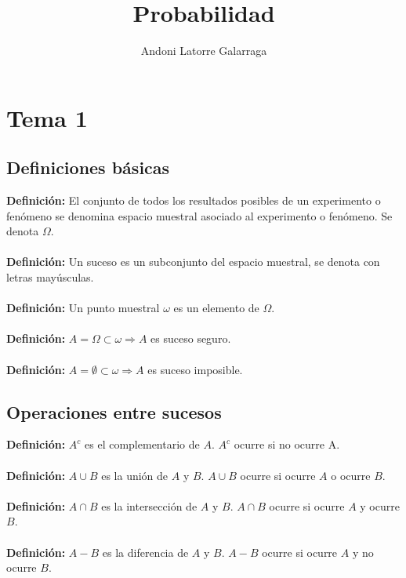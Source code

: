 \documentclass{article}
\title{Probabilidad}
\author{Andoni Latorre Galarraga}
\date{}
\begin{document}
\maketitle
\setlength{\parindent}{0cm}

\section{Tema 1}

\subsection{Definiciones básicas}


\textbf{Definición:} El conjunto de todos los resultados posibles de un experimento o fenómeno se denomina espacio muestral asociado al experimento o fenómeno. Se denota $\Omega$.\\\\


\textbf{Definición:} Un suceso es un subconjunto del espacio muestral, se denota con letras mayúsculas.\\\\


\textbf{Definición:} Un punto muestral $\omega$ es un elemento de $\Omega$.\\\\


\textbf{Definición:} $A=\Omega \subset \omega \Rightarrow A$ es suceso seguro.\\\\


\textbf{Definición:} $A=\emptyset \subset \omega \Rightarrow A$ es suceso imposible.

\subsection{Operaciones entre sucesos}


\textbf{Definición:} $A^c$ es el complementario de $A$. $A^c$ ocurre si no ocurre A.\\\\


\textbf{Definición:} $A\cup B$ es la unión de $A$ y $B$. $A\cup B$ ocurre si ocurre $A$ o ocurre $B$.\\\\


\textbf{Definición:} $A\cap B$ es la intersección de $A$ y $B$. $A\cap B$ ocurre si ocurre $A$ y ocurre $B$.\\\\


\textbf{Definición:} $A-B$ es la diferencia de $A$ y $B$. $A-B$ ocurre si ocurre $A$ y no ocurre $B$.
\end{document}
